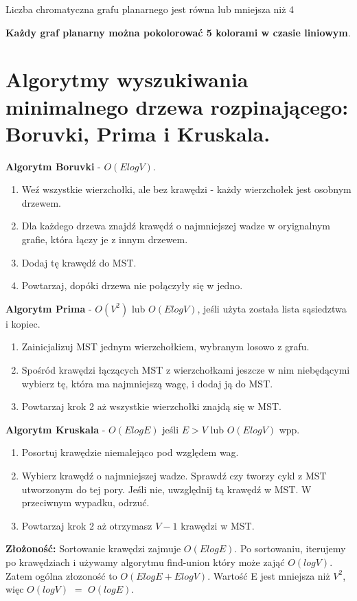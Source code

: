\documentclass[main.tex]{subfiles}
\begin{document}
    \begin{theorem}
        Liczba chromatyczna grafu planarnego jest równa lub mniejsza niż 4
    \end{theorem}

    \textbf{Każdy graf planarny można pokolorować 5 kolorami w czasie liniowym}.



    \section{Algorytmy wyszukiwania minimalnego drzewa rozpinającego: Boruvki, Prima i Kruskala.}

    \textbf{Algorytm Boruvki} - $O(ElogV)$.
    \begin{enumerate}[noitemsep]
        \item Weź wszystkie wierzchołki, ale bez krawędzi - każdy wierzchołek jest osobnym drzewem.
        \item Dla każdego drzewa znajdź krawędź o najmniejszej wadze w oryignalnym grafie, która łączy je z innym drzewem.
        \item Dodaj tę krawędź do MST.
        \item Powtarzaj, dopóki drzewa nie połączyły się w jedno.
    \end{enumerate}

    \noindent \textbf{Algorytm Prima} - $O(V^2)$ lub $O(ElogV)$, jeśli użyta została lista sąsiedztwa i kopiec.
    \begin{enumerate}[noitemsep]
        \item Zainicjalizuj MST jednym wierzchołkiem, wybranym losowo z grafu.
        \item Spośród krawędzi łączących MST z wierzchołkami jeszcze w nim niebędącymi wybierz tę, która ma najmniejszą wagę, i dodaj ją do MST.
        \item Powtarzaj krok 2 aż wszystkie wierzchołki znajdą się w MST.
    \end{enumerate}

    \noindent \textbf{Algorytm Kruskala} -  $O(ElogE)$ jeśli $E > V$ lub $O(ElogV)$ wpp.
    \begin{enumerate}[noitemsep]
        \item Posortuj krawędzie niemalejąco pod względem wag.
        \item Wybierz krawędź o najmniejszej wadze. Sprawdź czy tworzy cykl z MST utworzonym do tej pory. Jeśli nie, uwzględnij tą krawędź w MST. W przeciwnym wypadku, odrzuć.
        \item Powtarzaj krok 2 aż otrzymasz $V-1$ krawędzi w MST.
    \end{enumerate}
    \textbf{Złożoność:} Sortowanie krawędzi zajmuje $O(ElogE)$. Po sortowaniu, iterujemy po krawędziach i używamy
    algorytmu find-union który może zająć $O(logV)$. Zatem ogólna złozoność to $O(ElogE+ElogV)$. Wartość E jest
    mniejsza niż $V^2$, więc $O(logV)$ $=$ $O(logE)$.
\end{document}
